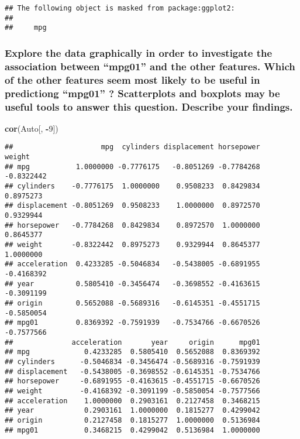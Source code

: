 \documentclass[]{article}
\newenvironment{Shaded}{\begin{snugshade}}{\end{snugshade}}
\newcommand{\KeywordTok}[1]{\textcolor[rgb]{0.13,0.29,0.53}{\textbf{#1}}}
\newcommand{\DecValTok}[1]{\textcolor[rgb]{0.00,0.00,0.81}{#1}}
\newcommand{\OperatorTok}[1]{\textcolor[rgb]{0.81,0.36,0.00}{\textbf{#1}}}
\newcommand{\NormalTok}[1]{#1}
\begin{document}
\begin{verbatim}
## The following object is masked from package:ggplot2:
## 
##     mpg
\end{verbatim}

\subsubsection{\texorpdfstring{Explore the data graphically in order to
investigate the association between ``mpg01'' and the other features.
Which of the other features seem most likely to be useful in predictiong
``mpg01'' ? Scatterplots and boxplots may be useful tools to answer this
question. Describe your
findings.}{Explore the data graphically in order to investigate the association between mpg01 and the other features. Which of the other features seem most likely to be useful in predictiong mpg01 ? Scatterplots and boxplots may be useful tools to answer this question. Describe your findings.}}\label{explore-the-data-graphically-in-order-to-investigate-the-association-between-mpg01-and-the-other-features.-which-of-the-other-features-seem-most-likely-to-be-useful-in-predictiong-mpg01-scatterplots-and-boxplots-may-be-useful-tools-to-answer-this-question.-describe-your-findings.}

\begin{Shaded}
\begin{Highlighting}[]
\KeywordTok{cor}\NormalTok{(Auto[, }\OperatorTok{-}\DecValTok{9}\NormalTok{])}
\end{Highlighting}
\end{Shaded}

\begin{verbatim}
##                     mpg  cylinders displacement horsepower     weight
## mpg           1.0000000 -0.7776175   -0.8051269 -0.7784268 -0.8322442
## cylinders    -0.7776175  1.0000000    0.9508233  0.8429834  0.8975273
## displacement -0.8051269  0.9508233    1.0000000  0.8972570  0.9329944
## horsepower   -0.7784268  0.8429834    0.8972570  1.0000000  0.8645377
## weight       -0.8322442  0.8975273    0.9329944  0.8645377  1.0000000
## acceleration  0.4233285 -0.5046834   -0.5438005 -0.6891955 -0.4168392
## year          0.5805410 -0.3456474   -0.3698552 -0.4163615 -0.3091199
## origin        0.5652088 -0.5689316   -0.6145351 -0.4551715 -0.5850054
## mpg01         0.8369392 -0.7591939   -0.7534766 -0.6670526 -0.7577566
##              acceleration       year     origin      mpg01
## mpg             0.4233285  0.5805410  0.5652088  0.8369392
## cylinders      -0.5046834 -0.3456474 -0.5689316 -0.7591939
## displacement   -0.5438005 -0.3698552 -0.6145351 -0.7534766
## horsepower     -0.6891955 -0.4163615 -0.4551715 -0.6670526
## weight         -0.4168392 -0.3091199 -0.5850054 -0.7577566
## acceleration    1.0000000  0.2903161  0.2127458  0.3468215
## year            0.2903161  1.0000000  0.1815277  0.4299042
## origin          0.2127458  0.1815277  1.0000000  0.5136984
## mpg01           0.3468215  0.4299042  0.5136984  1.0000000
\end{verbatim}
\end{document}
